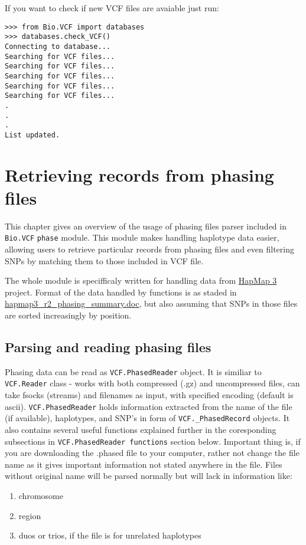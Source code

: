 \noindent If you want to check if new VCF files are avaiable just run:

\begin{verbatim}
>>> from Bio.VCF import databases
>>> databases.check_VCF()
Connecting to database...
Searching for VCF files...
Searching for VCF files...
Searching for VCF files...
Searching for VCF files...
Searching for VCF files...
.
.
.
List updated.
\end{verbatim}
    
    
\section {Retrieving records from phasing files}

This chapter gives an overview of the usage of phasing files parser included in \verb|Bio.VCF| \verb|phase| module.
This module makes handling haplotype data easier, allowing users to retrieve particular records from phasing files
and even filtering SNPs by matching them to those included in VCF file.

The whole module is specifficaly written for handling data from \href{ftp://ftp.hapmap.org/hapmap/phasing/2009-02\_phaseIII/HapMap3\_r2/}{HapMap 3} project.
Format of the data handled by functions is as staded in \href{ftp://ftp.hapmap.org/hapmap/phasing/2009-02\_phaseIII/HapMap3\_r2/hapmap3\_r2\_phasing\_summary.doc}{hapmap3\_r2\_phasing\_summary.doc},
but also assuming that SNPs in those files are sorted increasingly by position.


\subsection{Parsing and reading phasing files}

Phasing data can be read as \verb|VCF.PhasedReader| object. It is similiar to \verb|VCF.Reader| class - works with both compressed (.gz) and
uncompressed files, can take fsocks (streams) and filenames as input, with specified encoding (default is ascii).
\verb|VCF.PhasedReader| holds information extracted from the name of the file (if available), haplotypes, and SNP's in form of \verb|VCF._PhasedRecord| objects.
It also contains several useful functions explained further in the coresponding subsections in \verb|VCF.PhasedReader functions| section below.
Important thing is, if you are downloading the .phased file to your computer, rather not change the file name as it gives important
information not stated anywhere in the file. Files without original name will be parsed normally but will lack in information like:
\begin{enumerate}
  \item chromosome
  \item region
  \item duos or trios, if the file is for unrelated haplotypes
  \end{enumerate}

